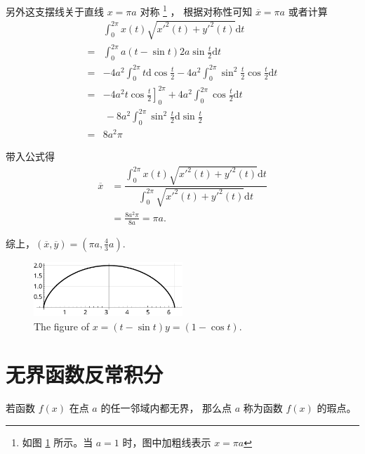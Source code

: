 \begin{example}
    另外这支摆线关于直线 $x = \pi a$ 对称
    \footnote{如图 \ref{fig:figure-of-w660-question-208} 所示。当 $a = 1$ 时，图中加粗线表示 $x = \pi a$} ，
    根据对称性可知 $\overline x = \pi a$
    或者计算 
    \begin{align*}
         &\int_0^{2\pi} x(t) \sqrt{x'^2(t) + y'^2(t)} \mathrm dt \\
        =&\int_0^{2\pi} a(t - \sin t) 2a \sin \frac{t}{2} \mathrm dt \\
        =&-4a^2 \int_0^{2\pi} t \mathrm d \cos \frac{t}{2} - 4a^2 \int_{0}^{2\pi} \sin^2 \frac{t}{2} \cos \frac{t}{2} \mathrm dt \\
        =&-4a^2 t \left.\cos \frac{t}{2}\right]^{2\pi}_0 + 4a^2 \int_0^{2\pi} \cos \frac{t}{2} \mathrm dt \\
         &{\,} -8a^2 \int_0^{2\pi} \sin^2 \frac{t}{2} \mathrm d \sin \frac{t}{2} \\
        =&8a^2 \pi
    \end{align*}

    带入公式得
    \begin{align*}
        \overline x &= \dfrac{
                           \int_0^{2\pi} x(t) \sqrt{x'^2(t) + y'^2(t)} \mathrm dt 
                       }{
                           \int_0^{2\pi} \sqrt{x'^2(t) + y'^2(t)} \mathrm dt
                       } \\
                    &= \frac{8a^2 \pi}{8a} = \pi a.
    \end{align*}
    
    综上，$(\overline x, \overline y) = (\pi a, \frac{4}{3}a)$.
\end{example}

\begin{figure}
    \centering
    \includegraphics[width=0.5\textwidth]{figure/figure-of-w660-question-208.pdf}
    \caption{The figure of $x = (t - \sin t) y = (1 - \cos t)$.}
    \label{fig:figure-of-w660-question-208}
\end{figure}

\section{无界函数反常积分}

\begin{definition}
    若函数 $f(x)$ 在点 $a$ 的任一邻域内都无界，
    那么点 $a$ 称为函数 $f(x)$ 的瑕点。
\end{definition}

